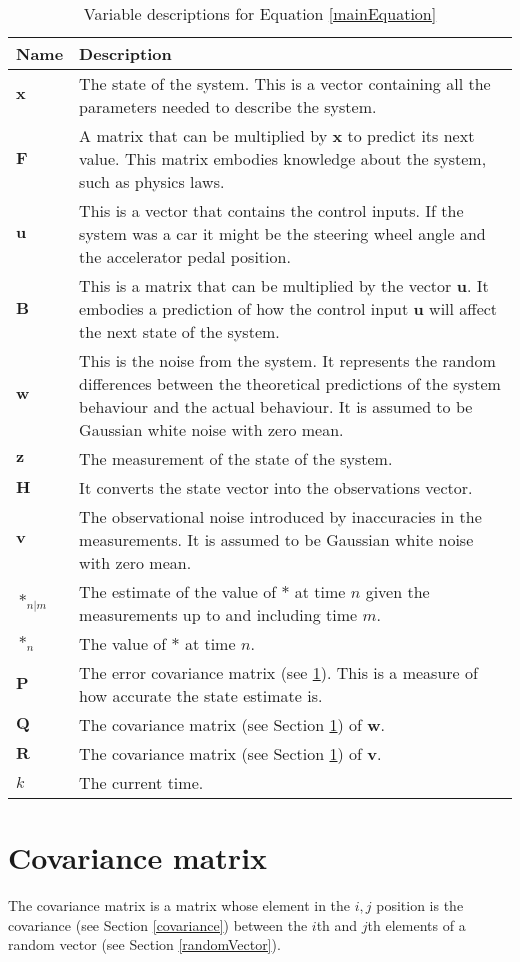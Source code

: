 \documentclass{article}
\begin{document}
\begin{table}
\begin{tabular}{lp{10cm}}\toprule
Name & Description \\ \midrule
$\bm{x}$ & The state of the system.  This is a vector containing all the parameters needed to describe the system. \\
$\bm{F}$ & A matrix that can be multiplied by $\bm{x}$ to predict its next value.  This matrix embodies knowledge about the system, such as physics laws. \\
$\bm{u}$ & This is a vector that contains the control inputs.  If the system was a car it might be the steering wheel angle and the accelerator pedal position. \\
$\bm{B}$ & This is a matrix that can be multiplied by the vector $\bm{u}$.  It embodies a prediction of how the control input $\bm{u}$ will affect the next state of the system. \\
$\bm{w}$ & This is the noise from the system.  It represents the random differences between the theoretical predictions of the system behaviour and the actual behaviour.  It is assumed to be Gaussian white noise with zero mean.\\
$\bm z$ & The measurement of the state of the system. \\
$\bm H$ & It converts the state vector into the observations vector. \\
$\bm v$ & The observational noise introduced by inaccuracies in the measurements.  It is assumed to be Gaussian white noise with zero mean. 
\\
$*_{n|m}$ & The estimate of the value of $*$ at time $n$ given the measurements up to and including time $m$.\\
$*_n$ & The value of $*$ at time $n$.\\
$\bm P$ & The error covariance matrix (see \ref{covarianceMatrix}).  This is a measure of how accurate the state estimate is.\\
$\bm Q$ & The covariance matrix (see Section \ref{covarianceMatrix}) of $\bm w$.\\
$\bm R$ & The covariance matrix (see Section \ref{covarianceMatrix}) of $\bm v$. \\
$k$ & The current time.\\ \bottomrule
\end{tabular}
\caption{Variable descriptions for Equation \ref{mainEquation}}
\label{variableDescriptions}
\end{table}
\section{Covariance matrix} \label{covarianceMatrix}
The covariance matrix is a matrix whose element in the $i,j$ position is the covariance (see Section \ref{covariance}) between the $i$th and $j$th elements of a random vector (see Section \ref{randomVector}).
\end{document}
